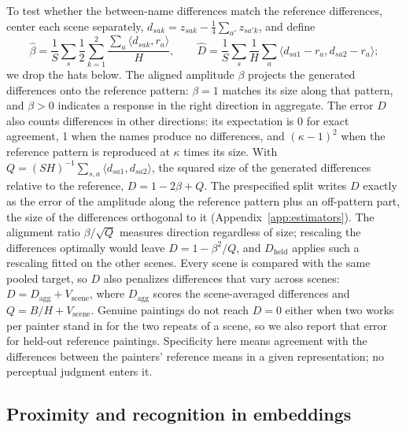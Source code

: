 \documentclass[10pt]{article}
\newcommand{\ip}[2]{\langle #1,#2\rangle}
\begin{document}
To test whether the between-name differences match the reference differences, center each scene
separately, $d_{sak}=z_{sak}-\frac14\sum_{a'}z_{sa'k}$, and define
\begin{equation}
\widehat\beta=\frac1S\sum_s\frac{1}{2}\sum_{k=1}^2\frac{\sum_a\ip{d_{sak}}{r_a}}{H},\qquad
\widehat D=\frac1S\sum_s\frac1H\sum_a\ip{d_{sa1}-r_a}{d_{sa2}-r_a};
\label{eq:beta-d}
\end{equation}
we drop the hats below. The aligned amplitude $\beta$ projects the generated differences onto the
reference pattern: $\beta=1$ matches its size along that pattern, and $\beta>0$ indicates a
response in the right direction in aggregate. The error $D$ also counts differences in other
directions: its expectation is 0 for exact agreement, 1 when the names produce no differences, and
$(\kappa-1)^2$ when the reference pattern is reproduced at $\kappa$ times its size. With
$Q=(SH)^{-1}\sum_{s,a}\ip{d_{sa1}}{d_{sa2}}$, the squared size of the generated differences
relative to the reference, $D=1-2\beta+Q$. The prespecified split writes $D$ exactly as the error of
the amplitude along the reference pattern plus an off-pattern part, the size of the differences
orthogonal to it (Appendix~\ref{app:estimators}). The alignment ratio $\beta/\sqrt{Q}$ measures
direction regardless of size; rescaling the differences optimally would leave $D=1-\beta^2/Q$, and
$D_{\mathrm{held}}$ applies such a rescaling fitted on the other scenes. Every scene is compared with
the same pooled target, so $D$ also penalizes differences that vary across scenes:
$D=D_{\mathrm{agg}}+V_{\mathrm{scene}}$, where $D_{\mathrm{agg}}$ scores the scene-averaged
differences and $Q=B/H+V_{\mathrm{scene}}$. Genuine paintings do not reach $D=0$ either when two
works per painter stand in for the two repeats of a scene, so we also report that error for held-out
reference paintings. Specificity here means agreement with the differences between the painters'
reference means in a given representation; no perceptual judgment enters it.

\subsection{Proximity and recognition in embeddings}\label{sec:proximity}
\end{document}
